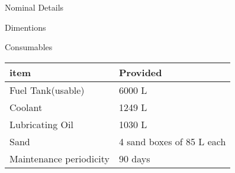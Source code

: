 \documentclass[
  ignorenonframetext,
]{beamer}
\begin{document}
\begin{frame}{Nominal Details}
\begin{block}{Dimentions}
\begin{shaded}
\end{shaded}
\end{block}

\begin{block}{Consumables}
\protect\hypertarget{consumables}{}
\begin{longtable}[]{@{}ll@{}}
\toprule
item & Provided \\
\midrule
\endhead
Fuel Tank(usable) & 6000 L \\
Coolant & 1249 L \\
Lubricating Oil & 1030 L \\
Sand & 4 sand boxes of 85 L each \\
Maintenance periodicity & 90 days \\
\bottomrule
\end{longtable}
\end{block}
\end{frame}
\end{document}
